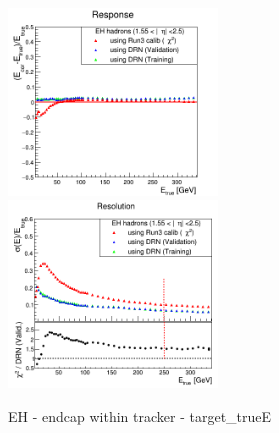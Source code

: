 \begin{figure}                                                                                                                                                                   
\includegraphics[width=0.495\textwidth]{./HCAL_plots/Trained_target_ratioflip_0_500_10/pdf/EH_ec_in/EC_within_tracker_corrEtaEndcapEcalHcal.png}
\includegraphics[width=0.495\textwidth]{./HCAL_plots/Trained_target_ratioflip_0_500_10/pdf/EH_ec_in/EC_within_tracker_corrEtaEndcapEcalHcal_reso.png}
\caption{EH - endcap within tracker - target_trueE}
\end{figure}


